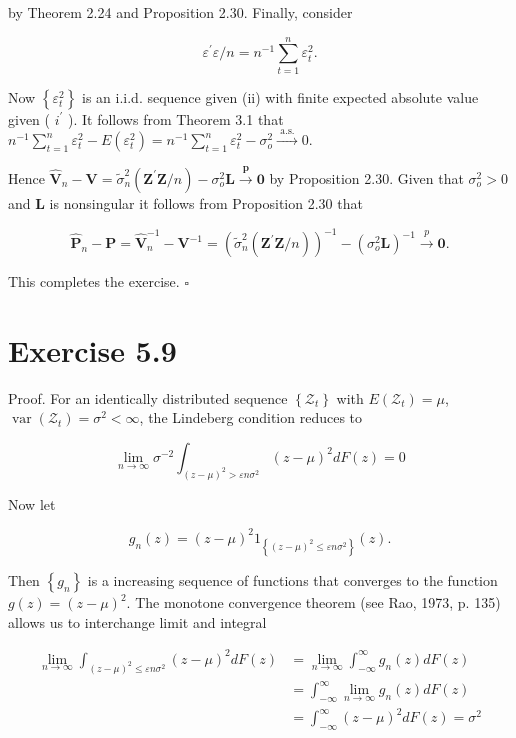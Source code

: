 \documentclass[10pt]{article}
\begin{document}
by Theorem 2.24 and Proposition 2.30. Finally, consider

$$
\varepsilon^{\prime} \varepsilon / n=n^{-1} \sum_{t=1}^{n} \varepsilon_{t}^{2} .
$$

Now $\left\{\varepsilon_{t}^{2}\right\}$ is an i.i.d. sequence given (ii) with finite expected absolute value given ( $i^{\prime}$ ). It follows from Theorem 3.1 that $n^{-1} \sum_{t=1}^{n} \varepsilon_{t}^{2}-E\left(\varepsilon_{t}^{2}\right)= n^{-1} \sum_{t=1}^{n} \varepsilon_{t}^{2}-\sigma_{o}^{2} \xrightarrow{\text { a.s. }} 0$.

Hence $\hat{\mathbf{V}}_{n}-\mathbf{V}=\tilde{\sigma}_{n}^{2}\left(\mathbf{Z}^{\prime} \mathbf{Z} / n\right)-\sigma_{o}^{2} \mathbf{L} \xrightarrow{\boldsymbol{p}} \mathbf{0}$ by Proposition 2.30. Given that $\sigma_{o}^{2}>0$ and $\mathbf{L}$ is nonsingular it follows from Proposition 2.30 that

$$
\hat{\mathbf{P}}_{n}-\mathbf{P}=\hat{\mathbf{V}}_{n}^{-1}-\mathbf{V}^{-1}=\left(\tilde{\sigma}_{n}^{2}\left(\mathbf{Z}^{\prime} \mathbf{Z} / n\right)\right)^{-1}-\left(\sigma_{o}^{2} \mathbf{L}\right)^{-1} \xrightarrow{p} \mathbf{0} .
$$

This completes the exercise. \(\square\)

\section*{Exercise 5.9}
Proof. For an identically distributed sequence $\left\{\mathcal{Z}_{t}\right\}$ with $E\left(\mathcal{Z}_{t}\right)=\mu$, $\operatorname{var}\left(\mathcal{Z}_{t}\right)=\sigma^{2}<\infty$, the Lindeberg condition reduces to

$$
\lim _{n \rightarrow \infty} \sigma^{-2} \int_{(z-\mu)^{2}>\varepsilon n \sigma^{2}}(z-\mu)^{2} d F(z)=0
$$

Now let

$$
g_{n}(z)=(z-\mu)^{2} 1_{\left\{(z-\mu)^{2} \leq \varepsilon n \sigma^{2}\right\}}(z) .
$$

Then $\left\{g_{n}\right\}$ is a increasing sequence of functions that converges to the function $g(z)=(z-\mu)^{2}$. The monotone convergence theorem (see Rao, 1973, p. 135) allows us to interchange limit and integral

$$
\begin{aligned}
\lim _{n \rightarrow \infty} \int_{(z-\mu)^{2} \leq \varepsilon n \sigma^{2}}(z-\mu)^{2} d F(z) & =\lim _{n \rightarrow \infty} \int_{-\infty}^{\infty} g_{n}(z) d F(z) \\
& =\int_{-\infty}^{\infty} \lim _{n \rightarrow \infty} g_{n}(z) d F(z) \\
& =\int_{-\infty}^{\infty}(z-\mu)^{2} d F(z)=\sigma^{2}
\end{aligned}
$$
\end{document}
